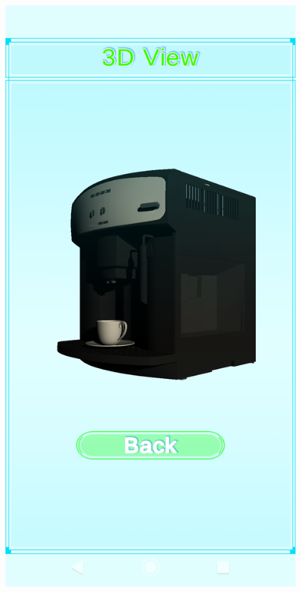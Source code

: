 \documentclass{aifyp}
\begin{document}
\begin{appendices}
\begin{figure}[H]
\begin{minipage}{.5\textwidth}
          \label{fig:CoffeeMachineDiagram}
        \end{minipage}%
        \begin{minipage}{.5\textwidth}
          \centering
          \includegraphics[scale=0.2]{Images/Chapter5/Impl4.png}
          \label{fig:CoffeeMachine3D}
        \end{minipage}
\end{figure}

\end{appendices}
\end{document}
